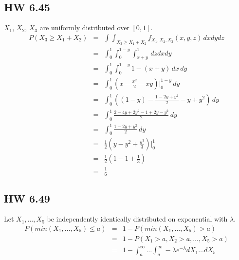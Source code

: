   \subsection*{HW 6.45}
    $X_1$, $X_2$, $X_3$ are uniformly distributed over $[0,1]$.\\
    \begin{eqnarray*}
      P(X_3 \ge X_1 + X_2) & = & \int\int_{X_3 \ge X_1 + X_2}
        f_{X_1, X_2, X_3}(x,y,z)\,dxdydz\\
      & = & \int_0^1 \int_0^{1-y}\int_{x + y}^1 \,dzdxdy\\
      & = & \int_0^1 \int_0^{1-y} 1 - (x+y)\,dx\,dy\\
      & = & \int_0^1 (x - \frac{x^2}{2} - xy)|_0^{1 - y} \,dy\\
      & = & \int_0^1 ((1-y) - \frac{1 - 2y + y^2}{2} - y + y^2)\,dy\\
      & = & \int_0^1 \frac{2 - 4y + 2y^2 - 1 + 2y - y^2}{2} \,dy\\
      & = & \int_0^1 \frac{1 - 2y + y^2}{2}\,dy\\
      & = & \frac{1}{2} (y - y^2 + \frac{y^3}{3}) |_0^1\\
      & = & \frac{1}{2} (1 - 1 + \frac{1}{3})\\
      & = & \frac{1}{6}
    \end{eqnarray*}

  \subsection*{HW 6.49}
    Let $X_1, \ldots, X_5$ be independently identically distributed on
    exponential with $\lambda$.\\
    \begin{eqnarray*}
      P(min(X_1, \ldots, X_5) \le a) & = & 1 - P(min(X_1, \ldots, X_5) > a)\\
        & = & 1 - P(X_1 > a, X_2 > a, \ldots, X_5 > a)\\
        & = & 1 - \int_a^{\infty} \ldots \int_a^{\infty} -\lambda e^{-\lambda}
        dX_1\ldots dX_5
    \end{eqnarray*}
